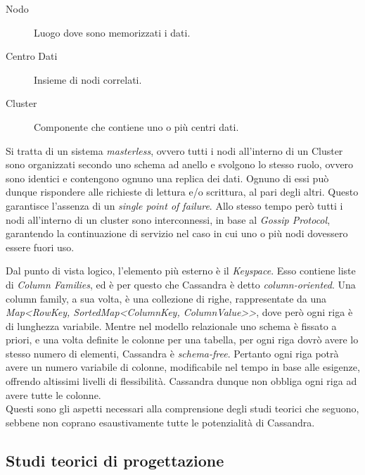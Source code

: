 		\begin{description}
			\item[Nodo] Luogo dove sono memorizzati i dati.
			\item[Centro Dati] Insieme di nodi correlati.
			\item[Cluster] Componente che contiene uno o più centri dati.
		\end{description}
	
		Si tratta di un sistema \textit{masterless}, ovvero tutti i nodi all'interno di un Cluster sono organizzati secondo uno schema ad anello e svolgono lo stesso ruolo, ovvero sono identici e contengono ognuno una replica dei dati. Ognuno di essi può dunque rispondere alle richieste di lettura e/o scrittura, al pari degli altri. Questo garantisce l'assenza di un \textit{single point of failure}. Allo stesso tempo però tutti i nodi all'interno di un cluster sono interconnessi, in base al \textit{Gossip Protocol}, garantendo la continuazione di servizio nel caso in cui uno o più nodi dovessero essere fuori uso.
		
		Dal punto di vista logico, l'elemento più esterno è il \textit{Keyspace}. Esso contiene liste di \textit{Column Families}, ed è per questo che Cassandra è detto \textit{column-oriented}. Una column family, a sua volta, è una collezione di righe, rappresentate da una \textit{Map<RowKey, SortedMap<ColumnKey, ColumnValue>{}>}, dove però ogni riga è di lunghezza variabile. Mentre nel modello relazionale uno schema è fissato a priori, e una volta definite le colonne per una tabella, per ogni riga dovrò avere lo stesso numero di elementi, Cassandra è \textit{schema-free}. Pertanto ogni riga potrà avere un numero variabile di colonne, modificabile nel tempo in base alle esigenze, offrendo altissimi livelli di flessibilità. Cassandra dunque non obbliga ogni riga ad avere tutte le colonne. \\
		Questi sono gli aspetti necessari alla comprensione degli studi teorici che seguono, sebbene non coprano esaustivamente tutte le potenzialità di Cassandra.
				
	\subsection{Studi teorici di progettazione}
		

